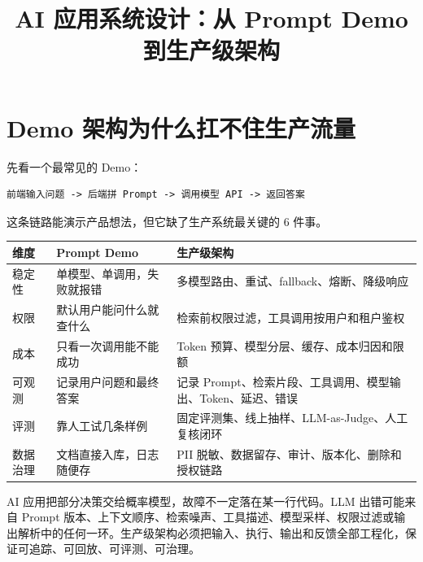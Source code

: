 \documentclass[9pt,a4paper,twocolumn]{ctexart}
\begin{document}
\title{AI 应用系统设计：从 Prompt Demo 到生产级架构}
\date{}
\maketitle
{}

\section*{Demo 架构为什么扛不住生产流量}


先看一个最常见的 Demo：



\begin{lstlisting}
前端输入问题 -> 后端拼 Prompt -> 调用模型 API -> 返回答案
\end{lstlisting}



这条链路能演示产品想法，但它缺了生产系统最关键的 6 件事。


{\footnotesize
\begin{tabular}{|p{}|p{}|p{}|}
\hline
\textbf{维度} & \textbf{Prompt Demo} & \textbf{生产级架构} \\
\hline
稳定性 & 单模型、单调用，失败就报错 & 多模型路由、重试、fallback、熔断、降级响应 \\
\hline
权限 & 默认用户能问什么就查什么 & 检索前权限过滤，工具调用按用户和租户鉴权 \\
\hline
成本 & 只看一次调用能不能成功 & Token 预算、模型分层、缓存、成本归因和限额 \\
\hline
可观测 & 记录用户问题和最终答案 & 记录 Prompt、检索片段、工具调用、模型输出、Token、延迟、错误 \\
\hline
评测 & 靠人工试几条样例 & 固定评测集、线上抽样、LLM-as-Judge、人工复核闭环 \\
\hline
数据治理 & 文档直接入库，日志随便存 & PII 脱敏、数据留存、审计、版本化、删除和授权链路 \\
\hline
\end{tabular}
}



AI 应用把部分决策交给概率模型，故障不一定落在某一行代码。LLM 出错可能来自 Prompt 版本、上下文顺序、检索噪声、工具描述、模型采样、权限过滤或输出解析中的任何一环。生产级架构必须把输入、执行、输出和反馈全部工程化，保证可追踪、可回放、可评测、可治理。
\end{document}
